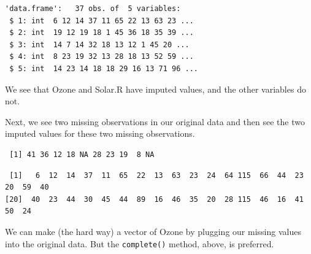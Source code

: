\documentclass[
  letterpaper,
  DIV=11,
  numbers=noendperiod]{scrreprt}
\newenvironment{Shaded}{\begin{snugshade}}{\end{snugshade}}
\newcommand{\DecValTok}[1]{\textcolor[rgb]{0.25,0.63,0.44}{#1}}
\newcommand{\FunctionTok}[1]{\textcolor[rgb]{0.02,0.16,0.49}{#1}}
\newcommand{\NormalTok}[1]{\textcolor[rgb]{0.00,0.44,0.13}{#1}}
\newcommand{\OtherTok}[1]{\textcolor[rgb]{0.00,0.44,0.13}{#1}}
\newcommand{\SpecialCharTok}[1]{\textcolor[rgb]{0.25,0.44,0.63}{#1}}
\begin{document}
\begin{Shaded}
\end{Shaded}

\begin{verbatim}
'data.frame':   37 obs. of  5 variables:
 $ 1: int  6 12 14 37 11 65 22 13 63 23 ...
 $ 2: int  19 12 19 18 1 45 36 18 35 39 ...
 $ 3: int  14 7 14 32 18 13 12 1 45 20 ...
 $ 4: int  8 23 19 32 13 28 18 13 52 59 ...
 $ 5: int  14 23 14 18 18 29 16 13 71 96 ...
\end{verbatim}

We see that Ozone and Solar.R have imputed values, and the other
variables do not.

Next, we see two missing observations in our original data and then see
the two imputed values for these two missing observations.

\begin{Shaded}
\end{Shaded}

\begin{verbatim}
 [1] 41 36 12 18 NA 28 23 19  8 NA
\end{verbatim}

\begin{Shaded}
\end{Shaded}

\begin{verbatim}
 [1]   6  12  14  37  11  65  22  13  63  23  24  64 115  66  44  23  20  59  40
[20]  40  23  44  30  45  44  89  16  46  35  20  28 115  46  16  41  50  24
\end{verbatim}

We can make (the hard way) a vector of Ozone by plugging our missing
values into the original data. But the \texttt{complete()} method,
above, is preferred.

\begin{Shaded}
\end{Shaded}
\end{document}
